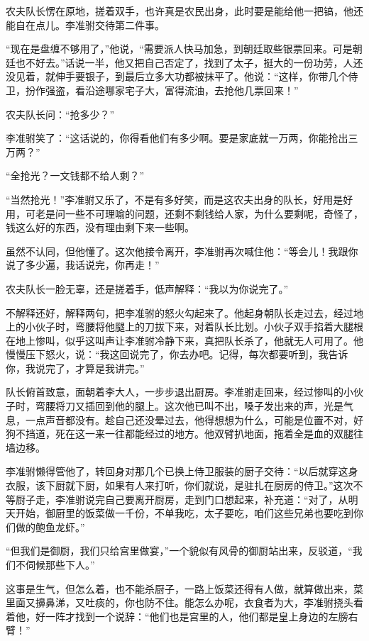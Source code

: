 农夫队长愣在原地，搓着双手，也许真是农民出身，此时要是能给他一把镐，他还能自在点儿。李准驸交待第二件事。

“现在是盘缠不够用了，”他说，“需要派人快马加急，到朝廷取些银票回来。可是朝廷也不好去。”话说一半，他又把自己否定了，找到了太子，挺大的一份功劳，人还没见着，就伸手要银子，到最后立多大功都被抹平了。他说：“这样，你带几个侍卫，扮作强盗，看沿途哪家宅子大，富得流油，去抢他几票回来！”

农夫队长问：“抢多少？”

李准驸笑了：“这话说的，你得看他们有多少啊。要是家底就一万两，你能抢出三万两？”

“全抢光？一文钱都不给人剩？”

“当然抢光！”李准驸又乐了，不是有多好笑，而是这农夫出身的队长，好用是好用，可老是问一些不可理喻的问题，还剩不剩钱给人家，为什么要剩呢，奇怪了，钱这么好的东西，没有理由剩下来一些啊。

虽然不认同，但他懂了。这次他接令离开，李准驸再次喊住他：“等会儿！我跟你说了多少遍，我话说完，你再走！”

农夫队长一脸无辜，还是搓着手，低声解释：“我以为你说完了。”

不解释还好，解释两句，把李准驸的怒火勾起来了。他起身朝队长走过去，经过地上的小伙子时，弯腰将他腿上的刀拔下来，对着队长比划。小伙子双手掐着大腿根在地上惨叫，似乎这叫声让李准驸冷静下来，真把队长杀了，他就无人可用了。他慢慢压下怒火，说：“我这回说完了，你去办吧。记得，每次都要听到，我告诉你，我说完了，才算是我讲完。”

队长俯首致意，面朝着李大人，一步步退出厨房。李准驸走回来，经过惨叫的小伙子时，弯腰将刀又插回到他的腿上。这次他已叫不出，嗓子发出来的声，光是气息，一点声音都没有。趁自己还没晕过去，他得想想为什么，可能是位置不对，好狗不挡道，死在这一来一往都能经过的地方。他双臂扒地面，拖着全是血的双腿往墙边移。

李准驸懒得管他了，转回身对那几个已换上侍卫服装的厨子交待：“以后就穿这身衣服，该下厨就下厨，如果有人来打听，你们就说，是驻扎在厨房的侍卫。”这次不等厨子走，李准驸说完自己要离开厨房，走到门口想起来，补充道：“对了，从明天开始，御厨里的饭菜做一千份，不单我吃，太子要吃，咱们这些兄弟也要吃到你们做的鲍鱼龙虾。”

“但我们是御厨，我们只给宫里做宴，”一个貌似有风骨的御厨站出来，反驳道，“我们不伺候那些下人。”

这事是生气，但怎么着，也不能杀厨子，一路上饭菜还得有人做，就算做出来，菜里面又擤鼻涕，又吐痰的，你也防不住。能怎么办呢，衣食者为大，李准驸挠头看着他，好一阵才找到一个说辞：“他们也是宫里的人，他们都是皇上身边的左膀右臂！”

